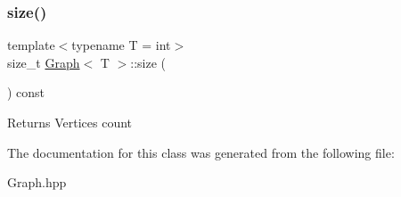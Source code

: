 \subsubsection{\texorpdfstring{size()}{size()}}
{\footnotesize\ttfamily template$<$typename T = int$>$ \\
size\+\_\+t \hyperlink{class_graph}{Graph}$<$ T $>$\+::size (\begin{DoxyParamCaption}{ }\end{DoxyParamCaption}) const\hspace{0.3cm}{\ttfamily [inline]}}

\begin{DoxyReturn}{Returns}
Vertices count 
\end{DoxyReturn}


The documentation for this class was generated from the following file\+:\begin{DoxyCompactItemize}
\item 
Graph.\+hpp\end{DoxyCompactItemize}
